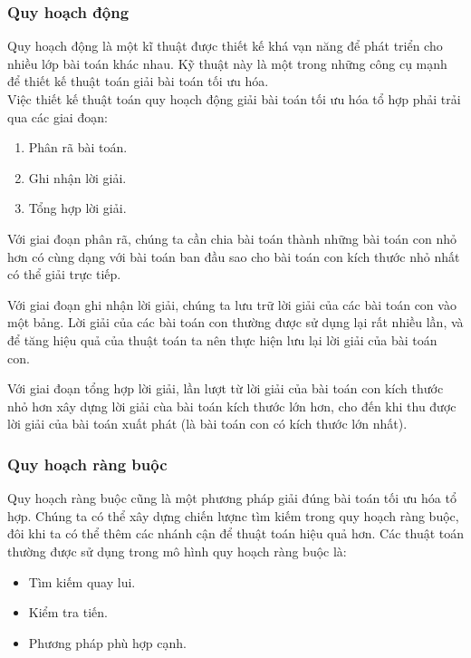 \documentclass[a4paper,12pt]{report}
\begin{document}
\subsubsection{Quy hoạch động}
Quy hoạch động \cite{DAA} là một kĩ thuật được thiết kế khá vạn năng để phát triển cho nhiều lớp bài toán khác nhau. Kỹ thuật này là một trong những công cụ mạnh để thiết kế thuật toán giải bài toán tối ưu hóa.\\

Việc thiết kế thuật toán quy hoạch động giải bài toán tối ưu hóa tổ hợp phải trải qua các giai đoạn: \begin{enumerate}
\item Phân rã bài toán.
\item Ghi nhận lời giải.
\item Tổng hợp lời giải.
\end{enumerate}

Với giai đoạn phân rã, chúng ta cần chia bài toán thành những bài toán con nhỏ hơn có cùng dạng với bài toán ban đầu sao cho bài toán con kích thước nhỏ nhất có thể giải trực tiếp. 

Với giai đoạn ghi nhận lời giải, chúng ta lưu trữ lời giải của các bài toán con vào một bảng. Lời giải của các bài toán con thường được sử dụng lại rất nhiều lần, và để tăng hiệu quả của thuật toán ta nên thực hiện lưu lại lời giải của bài toán con.

Với giai đoạn tổng hợp lời giải, lần lượt từ lời giải của bài toán con kích thước nhỏ hơn xây dựng lời giải cùa bài toán kích thước lớn hơn, cho đến khi thu được lời giải của bài toán xuất phát (là bài toán con có kích thước lớn nhất). 
\subsubsection{Quy hoạch ràng buộc}
Quy hoạch ràng buộc\cite{slidethayquang}\cite{HCP} cũng là một phương pháp giải đúng bài toán tối ưu hóa tổ hợp. Chúng ta có thể xây dựng chiến lượnc tìm kiếm trong quy hoạch ràng buộc, đôi khi ta có thể thêm các nhánh cận để thuật toán hiệu quả hơn. Các thuật toán thường được sử dụng trong mô hình quy hoạch ràng buộc là: \begin{itemize}
\item Tìm kiếm quay lui.
\item Kiểm tra tiến.
\item Phương pháp phù hợp cạnh.
\end{itemize}
\end{document}
